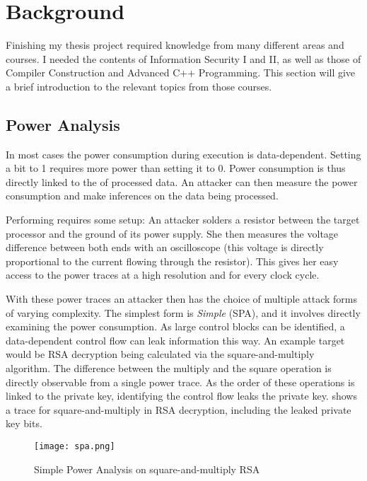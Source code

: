 \section{Background}
\label{background}
Finishing my thesis project required knowledge from many different areas and courses.
I needed the contents of Information Security I and II, as well as those of Compiler Construction and Advanced C++ Programming.
This section will give a brief introduction to the relevant topics from those courses.

\subsection{Power Analysis}
In most cases the power consumption during execution is data-dependent.
Setting a bit to 1 requires more power than setting it to 0.
Power consumption is thus directly linked to the \hammingw{} of processed data.
An attacker can then measure the power consumption and make inferences on the data being processed.

Performing \poweranalysis{} requires some setup:
An attacker solders a resistor between the target processor and the ground of its power supply.
She then measures the voltage difference between both ends with an oscilloscope (this voltage is directly proportional to the current flowing through the resistor).
This gives her easy access to the power traces at a high resolution and for every clock cycle.

With these power traces an attacker then has the choice of multiple attack forms of varying complexity.\cite{kocher1998introduction}\cite{brier2004correlation}
The simplest form is \emph{Simple \poweranalysis{}} (SPA), and it involves directly examining the power consumption.
As large control blocks can be identified, a data-dependent control flow can leak information this way.
An example target would be RSA decryption being calculated via the square-and-multiply algorithm.
The difference between the multiply and the square operation is directly observable from a single power trace.
As the order of these operations is linked to the private key, identifying the control flow leaks the private key.
 shows a trace for square-and-multiply in RSA decryption, including the leaked private key bits.

\begin{figure}[h]
  \centering
  \texttt{[image: spa.png]}
  \caption{Simple Power Analysis on square-and-multiply RSA\cite{boehme2017netsec}}
  \label{fig:spa}
\end{figure}

